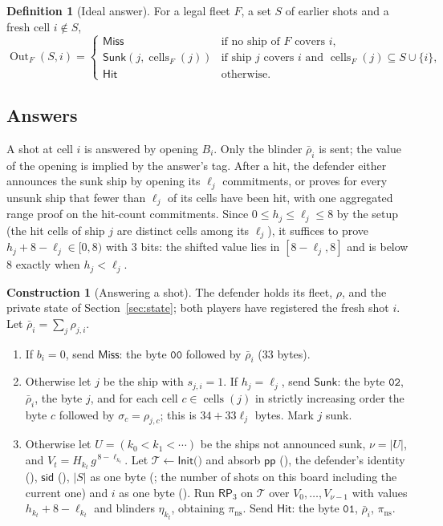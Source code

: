 \documentclass[11pt]{article}
\theoremstyle{definition}
\newtheorem{definition}[lemma]{Definition}
\newtheorem{construction}[lemma]{Construction}
\theoremstyle{remark}
\newcommand{\Out}{\operatorname{Out}}
\newcommand{\cells}{\operatorname{cells}}
\newcommand{\sid}{\mathsf{sid}}
\newcommand{\pp}{\mathsf{pp}}
\newcommand{\RP}{\mathsf{RP}}
\newcommand{\tr}{\mathcal{T}}
\begin{document}
\begin{definition}[Ideal answer]\label{def:out}
For a legal fleet $F$, a set $S$ of earlier shots and a fresh cell $i\notin S$,
\[
  \Out_F(S,i)=
  \begin{cases}
    \mathsf{Miss}&\text{if no ship of $F$ covers $i$},\\
    \mathsf{Sunk}(j,\cells_F(j))&\text{if ship $j$ covers $i$ and }\cells_F(j)\subseteq S\cup\{i\},\\
    \mathsf{Hit}&\text{otherwise}.
  \end{cases}
\]
\end{definition}

\subsection{Answers}\label{sec:answers}
A shot at cell $i$ is answered by opening $B_i$. Only the blinder $\bar\rho_i$ is sent; the value of the opening is implied by the answer's tag. After a hit, the defender either announces the sunk ship by opening its $\ell_j$ commitments, or proves for every unsunk ship that fewer than $\ell_j$ of its cells have been hit, with one aggregated range proof on the hit-count commitments. Since $0\le h_j\le\ell_j\le8$ by the setup (the hit cells of ship $j$ are distinct cells among its $\ell_j$), it suffices to prove $h_j+8-\ell_j\in[0,8)$ with $3$ bits: the shifted value lies in $[8-\ell_j,8]$ and is below $8$ exactly when $h_j<\ell_j$.

\begin{construction}[Answering a shot]\label{con:answer}
The defender holds its fleet, $\rho$, and the private state of Section~\ref{sec:state}; both players have registered the fresh shot $i$. Let $\bar\rho_i=\sum_j\rho_{j,i}$.
\begin{enumerate}[label=A\arabic*.]
  \item If $b_i=0$, send $\mathsf{Miss}$: the byte $\mathtt{00}$ followed by $\bar\rho_i$ (33 bytes).
  \item Otherwise let $j$ be the ship with $s_{j,i}=1$. If $h_j=\ell_j$, send $\mathsf{Sunk}$: the byte $\mathtt{02}$, $\bar\rho_i$, the byte $j$, and for each cell $c\in\cells(j)$ in strictly increasing order the byte $c$ followed by $\sigma_c=\rho_{j,c}$; this is $34+33\ell_j$ bytes. Mark $j$ sunk.
  \item Otherwise let $U=(k_0<k_1<\cdots)$ be the ships not announced sunk, $\nu=|U|$, and $V_t=H_{k_t}\,g^{\,8-\ell_{k_t}}$. Let $\tr\gets\mathsf{Init}($$)$ and absorb $\pp$ (), the defender's identity (), $\sid$ (), $|S|$ as one byte (; the number of shots on this board including the current one) and $i$ as one byte (). Run $\RP_3$ on $\tr$ over $V_0,\ldots,V_{\nu-1}$ with values $h_{k_t}+8-\ell_{k_t}$ and blinders $\eta_{k_t}$, obtaining $\pi_{\mathrm{ns}}$. Send $\mathsf{Hit}$: the byte $\mathtt{01}$, $\bar\rho_i$, $\pi_{\mathrm{ns}}$.
\end{enumerate}
\end{construction}
\end{document}
